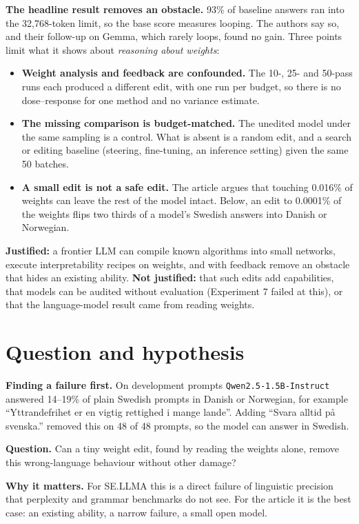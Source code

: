 \documentclass[10pt,a4paper]{article}
\newcommand{\code}[1]{{\small\texttt{#1}}}
\begin{document}
\textbf{The headline result removes an obstacle.} 93\% of baseline answers ran into the 32,768-token limit, so the base score measures looping. The authors say so, and their follow-up on Gemma, which rarely loops, found no gain.
Three points limit what it shows about \emph{reasoning about weights}:
\begin{itemize}
\item \textbf{Weight analysis and feedback are confounded.} The 10-, 25- and 50-pass runs each produced a different edit, with one run per budget, so there is no dose--response for one method and no variance estimate.
\item \textbf{The missing comparison is budget-matched.} The unedited model under the same sampling is a control. What is absent is a random edit, and a search or editing baseline (steering, fine-tuning, an inference setting) given the same 50 batches.
\item \textbf{A small edit is not a safe edit.} The article argues that touching 0.016\% of weights can leave the rest of the model intact. Below, an edit to 0.0001\% of the weights flips two thirds of a model's Swedish answers into Danish or Norwegian.
\end{itemize}
\textbf{Justified:} a frontier LLM can compile known algorithms into small networks, execute interpretability recipes on weights, and with feedback remove an obstacle that hides an existing ability.
\textbf{Not justified:} that such edits add capabilities, that models can be audited without evaluation (Experiment 7 failed at this), or that the language-model result came from reading weights.

\section{Question and hypothesis}

\textbf{Finding a failure first.} On development prompts \code{Qwen2.5-1.5B-Instruct} answered 14--19\% of plain Swedish prompts in Danish or Norwegian, for example
``Yttrandefrihet er en vigtig rettighed i mange lande''. Adding ``Svara alltid på svenska.'' removed this on 48 of 48 prompts, so the model can answer in Swedish.

\textbf{Question.} Can a tiny weight edit, found by reading the weights alone, remove this wrong-language behaviour without other damage?

\textbf{Why it matters.} For SE.LLMA this is a direct failure of linguistic precision that perplexity and grammar benchmarks do not see. For the article it is the best case: an existing ability, a narrow failure, a small open model.
\end{document}
